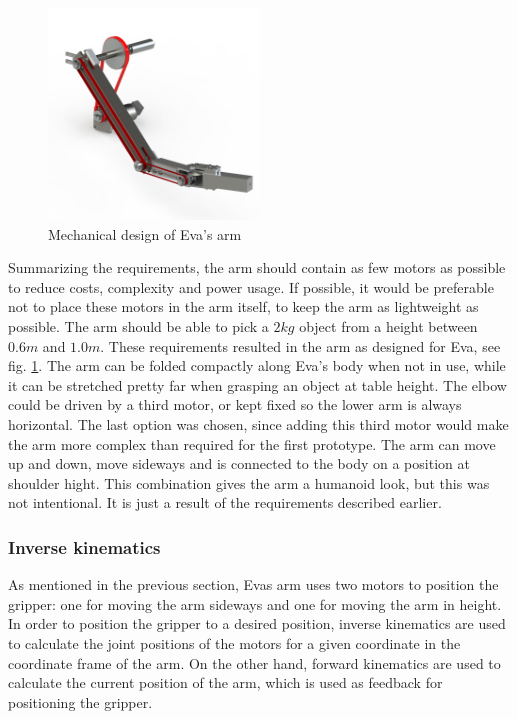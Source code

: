 \documentclass[project_eva.tex]{subfiles}
\begin{document}
\begin{figure}[h]
	\centering
	\mbox{\includegraphics[width=0.5\textwidth]{Images/armMechOverview.png}}
	\caption{Mechanical design of Eva's arm}
	\label{fig:armMechOverview}
\end{figure}

Summarizing the requirements, the arm should contain as few motors as possible to reduce costs, complexity and power usage. If possible, it would be preferable not to place these motors in the arm itself, to keep the arm as lightweight as possible. The arm should be able to pick a $2kg$ object from a height between $0.6m$ and $1.0m$. These requirements resulted in the arm as designed for Eva, see fig. \ref{fig:armMechOverview}.
The arm can be folded compactly along Eva’s body when not in use, while it can be stretched pretty far when grasping an object at table height. The elbow could be driven by a third motor, or kept fixed so the lower arm is always horizontal. The last option was chosen, since adding this third motor would make the arm more complex than required for the first prototype. The arm can move up and down, move sideways and is connected to the body on a position at shoulder hight. This combination gives the arm a humanoid look, but this was not intentional. It is just a result of the requirements described earlier.

\subsubsection*{Inverse kinematics}
As mentioned in the previous section, Eva\textquotesingle s arm uses two motors to position the gripper: one for moving the arm sideways and one for moving the arm in height. In order to position the gripper to a desired position, inverse kinematics are used 
to calculate the joint positions of the motors for a given coordinate in the coordinate frame of the arm. On the other 
hand, forward kinematics are used to calculate the current position of the arm, which is used as feedback for positioning 
the gripper. 
\end{document}
